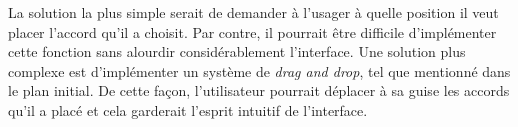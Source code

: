 \documentclass[letterpaper,12pt]{scrartcl}
\begin{document}
		 La solution la plus simple serait de demander à l'usager à quelle position il veut placer l'accord qu'il a choisit. Par contre, il pourrait être difficile d'implémenter cette fonction sans alourdir considérablement l'interface. Une solution plus complexe est d'implémenter un système de \textit{drag and drop}, tel que mentionné dans le plan initial. De cette façon, l'utilisateur pourrait déplacer à sa guise les accords qu'il a placé et cela garderait l'esprit intuitif de l'interface.
\end{document}
